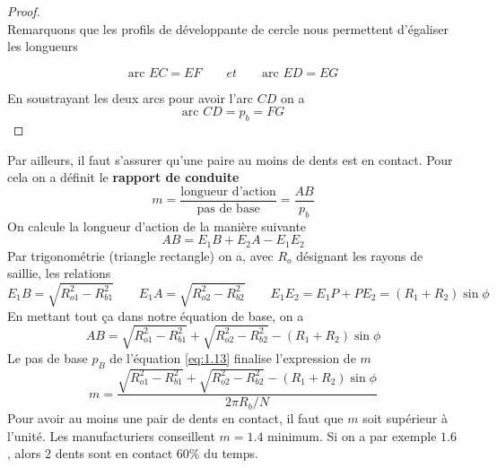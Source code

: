 	\begin{proof} \ \\
		Remarquons que les profils de développante de cercle nous permettent d'égaliser les longueurs 

		\begin{equation}
			\mbox{arc } EC = EF \qquad et \qquad \mbox{arc } ED = EG
		\end{equation}				
		
		En soustrayant les deux arcs pour avoir l'arc $CD$ on a 
		\begin{equation}
			\mbox{arc } CD = p_b = FG
		\end{equation}				
	\end{proof}
	
	Par ailleurs, il faut s'assurer qu'une paire au moins de dents est en contact. Pour cela on a définit le \textbf{rapport de conduite}
	\begin{equation}
	m = \frac{\mbox{longueur d'action}}{\mbox{pas de base}} = \frac{AB}{p_b}
	\end{equation}
	On calcule la longueur d'action de la manière suivante
	\begin{equation}
		AB = E_1B + E_2A -E_1E_2
	\end{equation}
		Par trigonométrie (triangle rectangle) on a, avec $R_o$ désignant les rayons de saillie, les relations
		\begin{equation}
		E_1B = \sqrt{R_{o1}^2-R_{b1}^2} \qquad E_1A = \sqrt{R_{o2}^2-R_{b2}^2} \qquad E_1E_2 = E_1P + PE_2 = (R_1 + R_2) \sin \phi
		\end{equation}
		En mettant tout ça dans notre équation de base, on a
		\begin{equation}
		AB = \sqrt{R_{o1}^2-R_{b1}^2} + \sqrt{R_{o2}^2-R_{b2}^2} - (R_1 + R_2) \sin \phi
		\end{equation}
		Le pas de base $p_B$ de l'équation \autoref{eq:1.13} finalise l'expression de $m$
		\begin{equation}
			m = \frac{\sqrt{R_{o1}^2-R_{b1}^2} + \sqrt{R_{o2}^2-R_{b2}^2} - (R_1 + R_2) \sin \phi}{2\pi R_b/N}
		\end{equation}
		Pour avoir au moins une pair de dents en contact, il faut que $m$ soit supérieur à l'unité. Les manufacturiers conseillent $m = 1.4$ minimum. Si on a par exemple $1.6$, alors 2 dents sont en contact $60 \%$ du temps.
		
